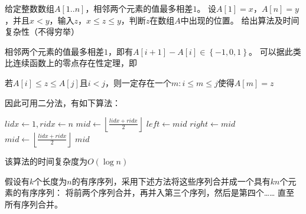 \begin{questions}
\begin{solution}
    \end{solution}


    \question 给定整数数组$A[1..n]$，相邻两个元素的值最多相差$1$。
    设$A[1]=x$，$A[n]=y$，并且$x<y$，输入$z$，$x \leq z \leq y$，判断$z$在数组$A$中出现的位置。
    给出算法及时间复杂性（不得穷举）

    \begin{solution}
        相邻两个元素的值最多相差$1$，即有$A[i+1] - A[i] \in \left\{-1, 0, 1\right\}$。
        可以据此类比连续函数上的零点存在性定理，即

        \begin{center}
            若$A[i] \leq z \leq A[j]$且$i < j$，则一定存在一个$m : i \leq m \leq j$使得$A[m] = z$
        \end{center}

        因此可用二分法，有如下算法：
        \begin{algorithm}[H]
            \caption{\quad}
            \begin{algorithmic}[1]
                \State $lidx \gets 1, ridx \gets n$
                \State $mid \gets \left\lfloor \frac{lidx+ridx}{2} \right\rfloor$
                \State $left \gets mid$ 
                \Else {}
                \State $right \gets mid$ 
                \EndIf
                \State $mid \gets \left\lfloor \frac{lidx+ridx}{2} \right\rfloor$
                \EndWhile
                \State \Return $mid$
            \end{algorithmic}

        \end{algorithm}

        该算法的时间复杂度为$O(\log n)$

    \end{solution}


    \question 假设有$k$个长度为$n$的有序序列，采用下述方法将这些序列合并成一个具有$kn$个元素的有序序列：
    将前两个序列合并，再并入第三个序列，然后是第四个……
    直至所有序列合并。
    \begin{parts}

\end{parts}
\end{questions}
